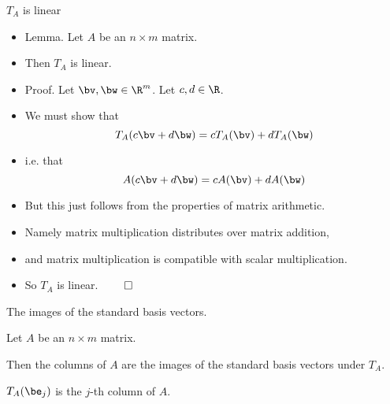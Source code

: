 \documentclass{beamer}
\begin{document}
\begin{frame}{$T_A$ is linear}

\begin{itemize}
\item Lemma. Let $A$ be an $n\times m$ matrix.
\item Then $T_A$ is linear.
\item Proof. Let $\bv,\bw\in\R^m$. Let $c,d\in\R$.
\item We must show that
$$T_A(c\bv + d\bw) = c T_A(\bv) + d T_A(\bw)$$
\item i.e. that
$$A(c\bv + d\bw) = c A(\bv) + d A(\bw)$$
\item But this just follows from the properties of matrix arithmetic.
\item Namely matrix multiplication distributes over matrix addition,
\item and matrix multiplication is compatible with scalar multiplication.
\item So $T_A$ is linear. $\qed$
\end{itemize}
\end{frame}

\beamerdefaultoverlayspecification{}

\begin{frame}{The images of the standard basis vectors.}

\begin{lemma}
Let $A$ be an $n\times m$ matrix.

\pause

\bigskip

Then the columns of $A$ are the
images of the standard basis vectors under $T_A$.

\bigskip


\pause

$T_A(\be_j)$ is the $j$-th column of $A$.
\end{lemma}
\end{frame}

\end{document}
